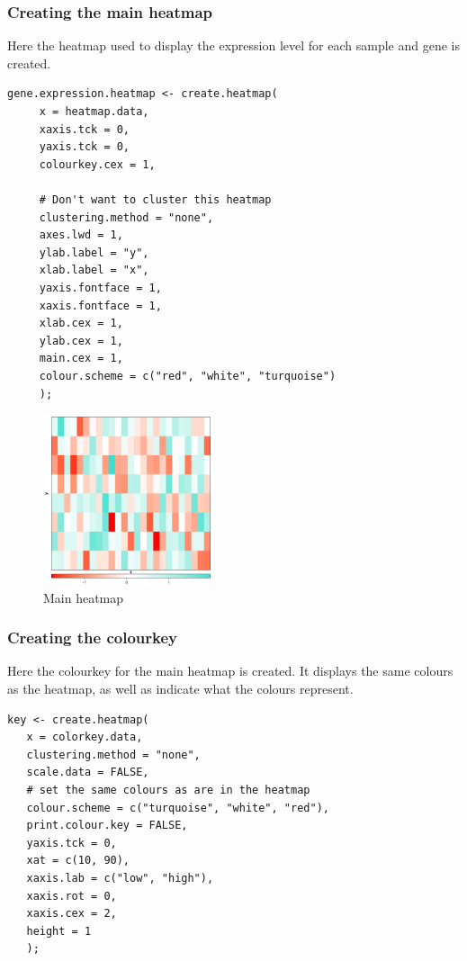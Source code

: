 \documentclass[letterpaper]{article}
\begin{document}
\subsubsection{Creating the main heatmap}

Here the heatmap used to display the expression level for each sample and gene is created. 

\begin{verbatim}
gene.expression.heatmap <- create.heatmap(
     x = heatmap.data,
     xaxis.tck = 0,
     yaxis.tck = 0,
     colourkey.cex = 1,
     
     # Don't want to cluster this heatmap
     clustering.method = "none",
     axes.lwd = 1,
     ylab.label = "y",
     xlab.label = "x",
     yaxis.fontface = 1,
     xaxis.fontface = 1,
     xlab.cex = 1,
     ylab.cex = 1,
     main.cex = 1,
     colour.scheme = c("red", "white", "turquoise")
     );
\end{verbatim}

\begin{figure}[!ht]
  \begin{center}
     \includegraphics[height = 50mm]{Figures/ex2_heatmap.png}
     \caption{Main heatmap}
     \label{fig:picture}
  \end{center}
\end{figure}

\subsubsection{Creating the colourkey}

Here the colourkey for the main heatmap is created. It displays the same colours as the heatmap, as well as indicate what the colours represent.

\begin{verbatim}
key <- create.heatmap(
   x = colorkey.data,
   clustering.method = "none",
   scale.data = FALSE,
   # set the same colours as are in the heatmap
   colour.scheme = c("turquoise", "white", "red"),
   print.colour.key = FALSE,
   yaxis.tck = 0,
   xat = c(10, 90),
   xaxis.lab = c("low", "high"),
   xaxis.rot = 0,
   xaxis.cex = 2,
   height = 1
   );
\end{verbatim}
\end{document}
